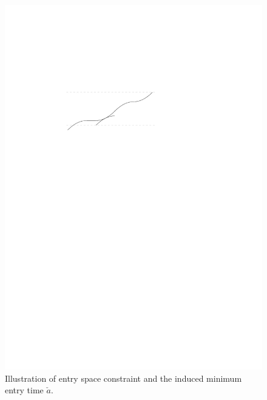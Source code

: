 \documentclass[a4paper]{article}
\theoremstyle{definition}
\theoremstyle{plain}
\begin{document}
\begin{figure}
  \centering
  \includegraphics[scale=1]{figures/motion/rough/bufferconstraint}
  \caption{Illustration of entry space constraint and the induced minimum entry
    time $\check{a}$.}%
  \label{fig:bufferconstraint}
\end{figure}
\end{document}
